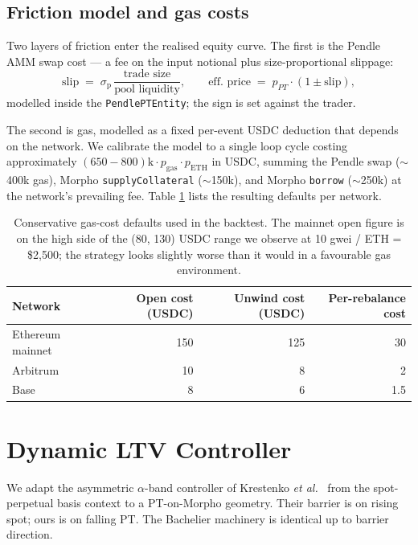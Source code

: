 \documentclass[11pt,a4paper]{article}
\begin{document}
\subsection{Friction model and gas costs}
\label{sec:gas}

Two layers of friction enter the realised equity curve. The first
is the Pendle AMM swap cost — a fee on the input notional plus
size-proportional slippage:
\begin{equation*}
  \mathrm{slip}
    \;=\; \sigma_{\mathrm{p}}\,\frac{\text{trade size}}{\text{pool liquidity}},
  \qquad
  \text{eff.\ price}
    \;=\; p_{PT} \cdot (1 \pm \mathrm{slip}),
\end{equation*}
modelled inside the \texttt{PendlePTEntity}; the sign is set
against the trader.

The second is gas, modelled as a fixed per-event USDC deduction
that depends on the network. We calibrate the model to a single
loop cycle costing approximately
\((650{-}800)\text{k} \cdot p_{\mathrm{gas}} \cdot p_{\mathrm{ETH}}\)
in USDC, summing the Pendle swap (\(\sim\)400k gas), Morpho
\texttt{supplyCollateral} (\(\sim\)150k), and Morpho \texttt{borrow}
(\(\sim\)250k) at the network's prevailing fee. Table
\ref{tab:gas} lists the resulting defaults per network.

\begin{table}[ht]
\centering
\begin{tabular}{lrrr}
\toprule
Network & Open cost (USDC) & Unwind cost (USDC) & Per-rebalance cost \\
\midrule
Ethereum mainnet & 150 & 125 & 30 \\
Arbitrum         &  10 &   8 &  2 \\
Base             &   8 &   6 &  1.5 \\
\bottomrule
\end{tabular}
\caption{Conservative gas-cost defaults used in the backtest. The
mainnet open figure is on the high side of the
(80, 130) USDC range we observe at 10 gwei / ETH = \$2{,}500;
the strategy looks slightly worse than it would in a favourable
gas environment.}
\label{tab:gas}
\end{table}

\section{Dynamic LTV Controller}
\label{sec:dynamic}

We adapt the asymmetric \(\alpha\)-band controller of
Krestenko \emph{et al.}~\cite{krestenko2026} from the
spot-perpetual basis context to a PT-on-Morpho geometry. Their
barrier is on rising spot; ours is on falling PT. The Bachelier
machinery is identical up to barrier direction.
\end{document}
